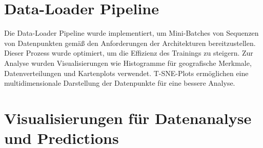 \documentclass[manuscript,screen,review]{acmart}
\begin{document}
\section{Data-Loader Pipeline}

Die Data-Loader Pipeline wurde implementiert, um Mini-Batches von Sequenzen von Datenpunkten gemäß den Anforderungen der Architekturen bereitzustellen. Dieser Prozess wurde optimiert, um die Effizienz des Trainings zu steigern. 
Zur Analyse wurden Visualisierungen wie Histogramme für geografische Merkmale, Datenverteilungen und Kartenplots verwendet. 
T-SNE-Plots ermöglichen eine multidimensionale Darstellung der Datenpunkte für eine bessere Analyse.

\section{Visualisierungen für Datenanalyse und Predictions}
\end{document}
